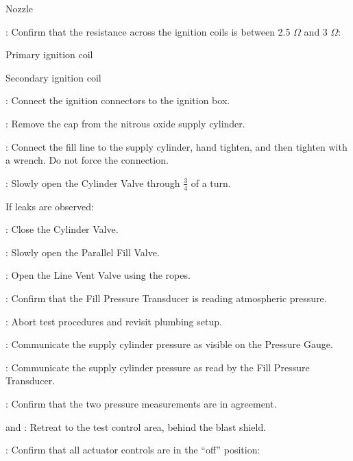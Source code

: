 \begin{checklist}
\begin {checklist}
        \item Nozzle
    \end {checklist}
    \item \secondary{}: Confirm that the resistance across the ignition coils is between 2.5 $\Omega$ and 3 $\Omega$:
    \begin{checklist}
            \item Primary ignition coil
            \item Secondary ignition coil
    \end{checklist}
    \item \secondary{}: Connect the ignition connectors to the ignition box. 
    \item \primary{}: Remove the cap from the nitrous oxide supply cylinder.
    \item \primary{}: Connect the fill line to the supply cylinder, hand tighten, and then tighten with a wrench. Do not force the connection.
    \item \primary{}: Slowly open the Cylinder Valve through $\frac{3}{4}$ of a turn.
    \begin{checklist}[label=$\bullet$]
        \item If leaks are observed:
        \begin{checklist}
            \item \primary{}: Close the Cylinder Valve.
            \item \primary{}: Slowly open the Parallel Fill Valve.
            \item \primary{}: Open the Line Vent Valve using the ropes.
            \item \daq{}: Confirm that the Fill Pressure Transducer is reading atmospheric pressure.
            \item \ops{}: Abort test procedures and revisit plumbing setup.
        \end{checklist}
    \end{checklist}
    \item \primary{}: Communicate the supply cylinder pressure as visible on the Pressure Gauge.
    \item \daq{}: Communicate the supply cylinder pressure as read by the Fill Pressure Transducer.
    \item \daq{}: Confirm that the two pressure measurements are in agreement.
    \item \primary{} and \secondary{}: Retreat to the test control area, behind the blast shield.
    \item \control{}: Confirm that all actuator controls are in the ``off'' position:

\end{checklist}
